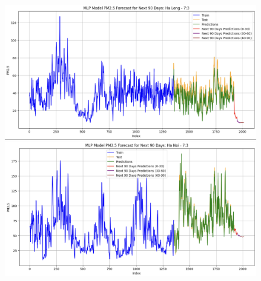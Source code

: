 
\begin{figure}[H]

    \centering
    \begin{minipage}{0.15\textwidth}
    \centering
    \end{minipage}
    \hfill

    \begin{minipage}{0.15\textwidth}
        \centering
        \includegraphics[width=1\textwidth, height=0.6\textwidth]{img/final/MLP/90D/MLP_7_3_HL.png}
        \end{minipage}
        \hfill
        \begin{minipage}{0.15\textwidth}
        \centering
        \includegraphics[width=1\textwidth, height=0.6\textwidth]{img/final/MLP/90D/MLP_7_3_HN.png}
        \end{minipage}
        \hfill
        \begin{minipage}{0.15\textwidth}
        \centering

\end{minipage}
\end{figure}
